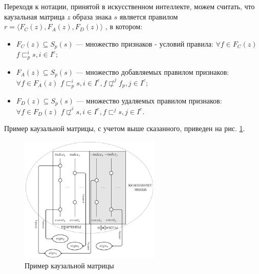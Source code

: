 \documentclass[12pt]{scrartcl}
\begin{document}
	Переходя к нотации, принятой в искусственном интеллекте, можем считать, что каузальная матрица $z$ образа знака $s$ является правилом $r=\langle F_C(z),F_A(z),F_D(z)\rangle$ \cite{Osipov2008b}, в котором:
	\begin{itemize}
		\item $F_C (z)\subseteq S_p(s)$ --- множество признаков - условий правила: $\forall f\in F_C(z)$ $f\sqsubset_p^i s, i\in I^c$;
		
		\item $F_A(z)\subseteq S_p(s)$ --- множество добавляемых правилом признаков: $\forall f\in F_A(z)$ $f\sqsubset_p^i s,i\in I^e, f\not\sqsubset^j f_p, j\in I^c$;
		
		\item $F_D(z)\subseteq S_p(s)$ --- множество удаляемых правилом признаков: $\forall f\in F_D(z)$ $f\not\sqsubset^i s, i\in I^e,f\sqsubset^j s, j\in I^c$.
	\end{itemize}

	Пример каузальной матрицы, с учетом выше сказанного, приведен на рис. \ref{fig:caus_matr}.

	\begin{figure}[H]
		\centering
		\includegraphics[width=0.6\textwidth]{causnet/caus_matr_ru}
		\caption{Пример каузальной матрицы}	
		\label{fig:caus_matr}	
	\end{figure}	
	
\end{document}
